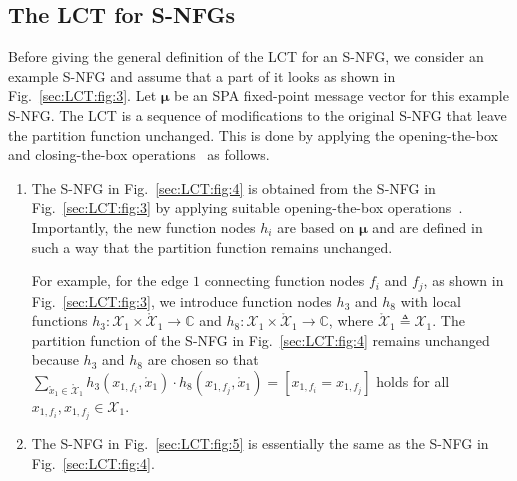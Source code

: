 \documentclass[journal]{IEEEtran}
\newcommand{\add}[1]{{\color{black}#1}}
\newcommand{\vect}[1]{ \bm{#1} }
\newcommand{\set}[1]{\mathcal{#1}}
\newcommand{\sC}{\mathbb{C}}
\newcommand{\vmu}{ \vect{ \mu } }
\newcommand{\defeq}{ \triangleq }
\newcommand{\LCTset}[1]{\mathring{\mathcal{#1}}}
\newcommand{\LCT}[1]{ \mathring{#1} }
\begin{document}
\subsection{The LCT for S-NFGs}
\label{sec:LCT:SNFG:1}

Before giving the general definition of the LCT for an S-NFG, we consider an
example S-NFG and assume that a part of it looks as shown in
Fig.~\ref{sec:LCT:fig:3}. Let
$\vmu $ be an SPA
fixed-point message vector for this example S-NFG. The LCT is a sequence of
modifications to the original S-NFG that leave the partition function
unchanged. This is done by applying the opening-the-box and closing-the-box
operations~\cite{Loeliger2004} as follows.
\begin{enumerate}

  \item The S-NFG in Fig.~\ref{sec:LCT:fig:4} is obtained from the S-NFG
        in Fig.~\ref{sec:LCT:fig:3} by applying suitable opening-the-box
        operations~\cite{Loeliger2004}. Importantly, the new function nodes $h_i$
        are based on $\vmu$ and are defined in such a way that the partition function remains unchanged.

        For example, for the edge $1$ connecting function nodes $f_{i}$ and $f_{j}$, as shown in Fig.~\ref{sec:LCT:fig:3}, we
        introduce function nodes $h_3$ and $h_8$ with local functions
        $h_3: \set{X}_{1} \times \LCTset{X}_{1} \to \sC$ and
        $h_8: \set{X}_{1} \times \LCTset{X}_{1} \to \sC$, where
        $\LCTset{X}_{1} \defeq \set{X}_{1} $. The partition function of the S-NFG in Fig.~\ref{sec:LCT:fig:4} remains unchanged because $h_3$ and $h_8$ are
        \add{chosen so that}
        $\sum_{\LCT{x}_{1} \in \LCTset{X}_{1}}
          h_3(x_{1,f_{i}}, \LCT{x}_{1}) \cdot h_8(x_{1,f_{j}}, \LCT{x}_{1}) =
          [x_{1,f_{i}} \! = \! x_{1,f_{j}}]$ holds for all
        $ x_{1,f_{i}}, x_{1,f_{j}} \in \set{X}_{1} $.

  \item The S-NFG in Fig.~\ref{sec:LCT:fig:5} is essentially the same as
        the S-NFG in Fig.~\ref{sec:LCT:fig:4}.


\end{enumerate}
\end{document}
